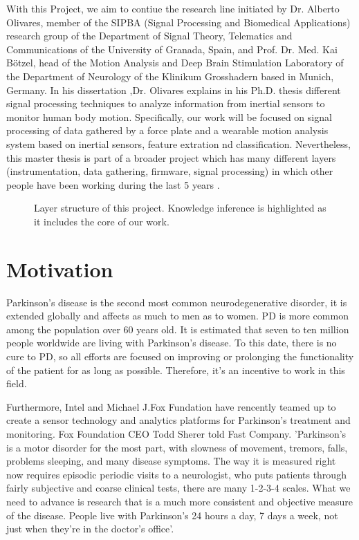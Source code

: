 With this Project, we aim  to contiue the research line initiated by Dr. Alberto Olivares, member of the SIPBA (Signal Processing and Biomedical Applications) research group of the Department of Signal Theory, Telematics and Communications of the University of Granada, Spain, and Prof. Dr. Med. Kai Bötzel, head of the Motion Analysis and Deep Brain Stimulation Laboratory of the Department of Neurology of the Klinikum Grosshadern based in Munich, Germany. In his dissertation ,Dr. Olivares explains in his Ph.D. thesis \cite{A.Olivares2013} different signal processing techniques to analyze information from inertial sensors to monitor human body motion.
Specifically, our work will be focused on signal processing of data gathered  by a force plate and a wearable motion analysis system based on inertial sensors, feature extration nd classification. Nevertheless, this master thesis is part of a broader project which has many different layers (instrumentation, data gathering, firmware, signal processing) in which other people have been working during the last 5 years .

 \begin{figure}[H]
 	\centering
 	\caption{Layer structure of this project. Knowledge inference is highlighted as it includes the core of our work.}
 	\label{fig:layer}
 \end{figure}
 \vfill

\section{Motivation}
Parkinson’s disease is the second most common neurodegenerative disorder, it is extended globally and affects as much to men as to women. PD is more common among the population over 60 years old. It is estimated that seven  to ten million people worldwide are living with Parkinson’s disease. To this date, there is no cure to PD, so all efforts are focused on improving or prolonging the functionality of the patient for as long as possible. Therefore, it’s an incentive to work in this field\cite{ParkinsonDisease}\cite{pdf}. 

Furthermore, Intel and Michael J.Fox Fundation have rencently teamed up to create a sensor technology and analytics platforms for Parkinson’s treatment and monitoring. Fox Foundation CEO Todd Sherer told Fast Company. 'Parkinson’s is a motor disorder for the most part, with slowness of movement, tremors, falls, problems sleeping, and many disease symptoms. The way it is measured right now requires episodic periodic visits to a neurologist, who puts patients through fairly subjective and coarse clinical tests, there are many 1-2-3-4 scales. What we need to advance is research that is a much more consistent and objective measure of the disease. People live with Parkinson’s 24 hours a day, 7 days a week, not just when they're in the doctor’s office'\cite{IntelAndMjf}.

